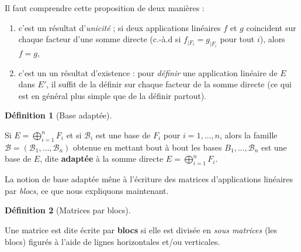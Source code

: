 \documentclass[
  french,
  letterpaper,
  DIV=11,
  numbers=noendperiod]{scrreprt}
\theoremstyle{plain}
\theoremstyle{definition}
\newtheorem{definition}{Définition}[chapter]
\theoremstyle{plain}
\theoremstyle{plain}
\theoremstyle{definition}
\theoremstyle{definition}
\theoremstyle{plain}
\theoremstyle{remark}
\newcounter{quartocalloutnteno}
\newcommand{\quartocalloutnte}[1]{\refstepcounter{quartocalloutnteno}\label{#1}}
\begin{document}
\begin{tcolorbox}[enhanced jigsaw, arc=.35mm, bottomrule=.15mm, bottomtitle=1mm, breakable, colback=white, colbacktitle=quarto-callout-note-color!10!white, colframe=quarto-callout-note-color-frame, coltitle=black, left=2mm, leftrule=.75mm, opacityback=0, opacitybacktitle=0.6, rightrule=.15mm, title=\textcolor{quarto-callout-note-color}{\faInfo}\hspace{0.5em}{Note \ref*{nte-definition-somme-directe}}, titlerule=0mm, toprule=.15mm, toptitle=1mm]

\quartocalloutnte{nte-definition-somme-directe} 

Il faut comprendre cette proposition de deux manières :

\begin{enumerate}
\def\labelenumi{\arabic{enumi}.}
\item
  c'est un résultat d'\emph{unicité} ; si deux applications linéaires
  \(f\) et \(g\) coincident sur chaque facteur d'une somme directe
  (c.-à.d si \(f_{|F_{i}}=g_{|F_{i}}\) pour tout \(i\)), alors \(f=g\),
\item
  c'est un un résultat d'existence : pour \emph{définir} une application
  linéaire de \(E\) dans \(E'\), il suffit de la définir sur chaque
  facteur de la somme directe (ce qui est en général plus simple que de
  la définir partout).
\end{enumerate}

\end{tcolorbox}

\begin{definition}[Base
adaptée]\protect\hypertarget{def-base-adapte}{}\label{def-base-adapte}

Si \(E=\bigoplus_{i=1}^{n} F_{i}\) et si \(\mathcal{B}_i\) est une base
de \(F_{i}\) pour \(i=1,\dots,n\), alors la famille
\(\mathcal{B}=(\mathcal{B}_{1},\dots,\mathcal{B}_{n})\) obtenue en
mettant bout à bout les bases \(B_{1},\dots,\mathcal{B}_{n}\) est une
base de \(E\), dite \textbf{adaptée} à la somme directe
\(E=\bigoplus_{i=1}^{n}F_{i}\).

\end{definition}

La notion de base adaptée mêne à l'écriture des matrices d'applications
linéaires par \emph{blocs}, ce que nous expliquons maintenant.

\begin{definition}[Matrices par
blocs]\protect\hypertarget{def-matrice-par-bloc}{}\label{def-matrice-par-bloc}

Une matrice est dite écrite par \textbf{blocs} si elle est divisée en
\emph{sous matrices} (les blocs) figurés à l'aide de lignes horizontales
et/ou verticales.

\end{definition}
\end{document}
